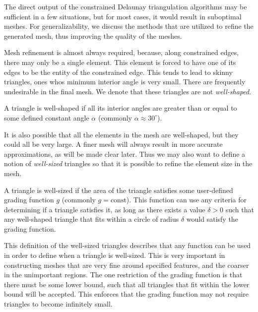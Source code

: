 \documentclass[../fem.tex]{subfile}
\begin{document}
The direct output of the constrained Delaunay triangulation algorithms may be
sufficient in a few situations, but for most cases, it would result in
suboptimal meshes. For generalizability, we discuss the methods that are utilized
to refine the generated mesh, thus improving the quality of the meshes.

Mesh refinement is almost always required, because, along constrained edges,
there may only be a single element. This element is forced to have one of its
edges to be the entity of the constrained edge. This tends to lead to skinny
triangles, ones whos minimum interior angle is very small. There are frequently
undesirable in the final mesh. We denote that these triangles are not
\textit{well-shaped}.

\begin{definition} \label{def:well_shaped}
  A triangle is well-shaped if all its interior angles are greater than or
  equal to some defined constant angle $\alpha$ (commonly
  $\alpha\approx30^\circ$).
\end{definition}

It is also possible that all the elements in the mesh are well-shaped, but they
could all be very large. A finer mesh will always result in more accurate
approximations, as will be made clear later. Thus we may also want to define a
notion of \textit{well-sized} triangles so that it is possible to refine the
element size in the mesh.

\begin{definition} \label{def:well_sized}
  A triangle is well-sized if the area of the triangle satisfies some user-defined grading function $g$ (commonly $g=\text{const}$). This function can
  use any criteria for determining if a triangle satisfies it, as long as there
  exists a value $\delta>0$ such that any well-shaped triangle that fits within
  a circle of radius $\delta$ would satisfy the grading function.
\end{definition}

This definition of the well-sized triangles describes that any function can be
used in order to define when a triangle is well-sized. This is very important
in constructing meshes that are very fine around specified features, and the
coarser in the unimportant regions. The one restriction of the grading function
is that there must be some lower bound, such that all triangles that fit within
the lower bound will be accepted. This enforces that the grading function may
not require triangles to become infinitely small.
\end{document}
